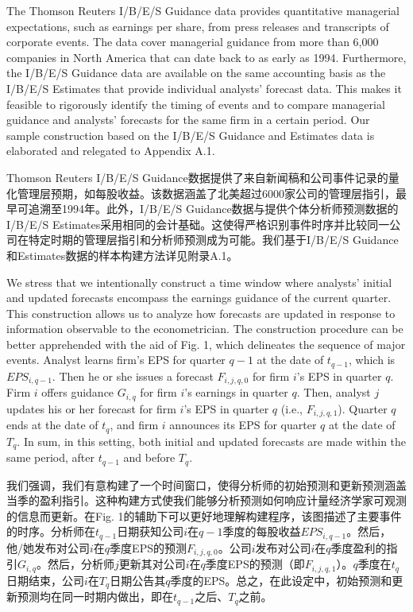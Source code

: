 \documentclass[12pt,a4paper]{article}
\newenvironment{original}
  {\par\medskip\noindent\ignorespaces}
  {\par\medskip}
\newenvironment{translation}
  {\par\noindent{\color{transblue}\ignorespaces}}
  {\par\bigskip}
\begin{document}
\begin{original}
The Thomson Reuters I/B/E/S Guidance data provides quantitative managerial expectations, such as earnings per share, from press releases and transcripts of corporate events. The data cover managerial guidance from more than 6,000 companies in North America that can date back to as early as 1994. Furthermore, the I/B/E/S Guidance data are available on the same accounting basis as the I/B/E/S Estimates that provide individual analysts' forecast data. This makes it feasible to rigorously identify the timing of events and to compare managerial guidance and analysts' forecasts for the same firm in a certain period. Our sample construction based on the I/B/E/S Guidance and Estimates data is elaborated and relegated to Appendix A.1.
\end{original}
\begin{translation}
Thomson Reuters I/B/E/S Guidance数据提供了来自新闻稿和公司事件记录的量化管理层预期，如每股收益。该数据涵盖了北美超过6000家公司的管理层指引，最早可追溯至1994年。此外，I/B/E/S Guidance数据与提供个体分析师预测数据的I/B/E/S Estimates采用相同的会计基础。这使得严格识别事件时序并比较同一公司在特定时期的管理层指引和分析师预测成为可能。我们基于I/B/E/S Guidance和Estimates数据的样本构建方法详见附录A.1。
\end{translation}

\begin{original}
We stress that we intentionally construct a time window where analysts' initial and updated forecasts encompass the earnings guidance of the current quarter. This construction allows us to analyze how forecasts are updated in response to information observable to the econometrician. The construction procedure can be better apprehended with the aid of Fig. 1, which delineates the sequence of major events. Analyst learns firm's EPS for quarter $q-1$ at the date of $t_{q-1}$, which is $EPS_{i,q-1}$. Then he or she issues a forecast $F_{i,j,q,0}$ for firm $i$'s EPS in quarter $q$. Firm $i$ offers guidance $G_{i,q}$ for firm $i$'s earnings in quarter $q$. Then, analyst $j$ updates his or her forecast for firm $i$'s EPS in quarter $q$ (i.e., $F_{i,j,q,1}$). Quarter $q$ ends at the date of $t_q$, and firm $i$ announces its EPS for quarter $q$ at the date of $T_q$. In sum, in this setting, both initial and updated forecasts are made within the same period, after $t_{q-1}$ and before $T_q$.
\end{original}
\begin{translation}
我们强调，我们有意构建了一个时间窗口，使得分析师的初始预测和更新预测涵盖当季的盈利指引。这种构建方式使我们能够分析预测如何响应计量经济学家可观测的信息而更新。在Fig. 1的辅助下可以更好地理解构建程序，该图描述了主要事件的时序。分析师在$t_{q-1}$日期获知公司$i$在$q-1$季度的每股收益$EPS_{i,q-1}$。然后，他/她发布对公司$i$在$q$季度EPS的预测$F_{i,j,q,0}$。公司$i$发布对公司$i$在$q$季度盈利的指引$G_{i,q}$。然后，分析师$j$更新其对公司$i$在$q$季度EPS的预测（即$F_{i,j,q,1}$）。$q$季度在$t_q$日期结束，公司$i$在$T_q$日期公告其$q$季度的EPS。总之，在此设定中，初始预测和更新预测均在同一时期内做出，即在$t_{q-1}$之后、$T_q$之前。
\end{translation}
\end{document}
